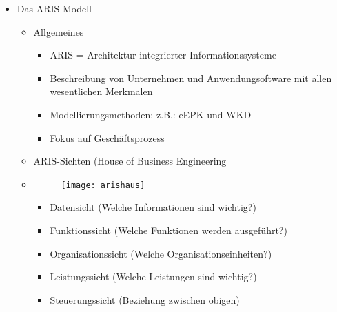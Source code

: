 \begin{itemize}
\begin{itemize}
\begin{itemize}
			\end{itemize}				
		
		\end{itemize}
		
	\item Das ARIS-Modell
		\begin{itemize}
		\item Allgemeines
			\begin{itemize}
			\item ARIS = Architektur integrierter Informationssysteme
			\item Beschreibung von Unternehmen und Anwendungsoftware mit allen wesentlichen Merkmalen
			\item Modellierungsmethoden: z.B.: eEPK und WKD 
			\item Fokus auf Geschäftsprozess
			\end{itemize}
		
		\item ARIS-Sichten (House of Business Engineering
		\item[] \begin{minipage}{0.35\textwidth}
				\begin{figure}[H]
				\texttt{[image: arishaus]}
				
				\end{figure}
			\end{minipage}
			\begin{minipage}[t]{0.55\textwidth}
				\vspace{-1.5cm}
				\begin{itemize}
				\item Datensicht (Welche Informationen sind wichtig?)
				\item Funktionssicht (Welche Funktionen werden ausgeführt?)
				\item Organisationssicht (Welche Organisationseinheiten?)
				\item Leistungssicht (Welche Leistungen sind wichtig?)
				\item Steuerungssicht (Beziehung zwischen obigen)
				\end{itemize}
			\end{minipage}
			
		\pagebreak
			

\end{itemize}
\end{itemize}
